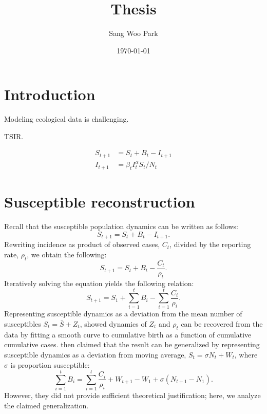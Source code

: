 \documentclass{article}
\title{Thesis}
\date{\today}
\author{Sang Woo Park}
\begin{document}
\maketitle

\section{Introduction}

Modeling ecological data is challenging.

TSIR.

\begin{equation}
\begin{aligned}
S_{t+1} &= S_t + B_t - I_{t+1}\\
I_{t+1} &= \beta_t I_{t}^\alpha S_t/N_t
\end{aligned}
\end{equation}

\section{Susceptible reconstruction}

Recall that the susceptible population dynamics can be written as follows:
\begin{equation}
S_{t+1} = S_{t} + B_t - I_{t+1}.
\end{equation}
Rewriting incidence as product of observed cases, $C_t$, divided by the reporting rate, $\rho_t$, we obtain the following:
\begin{equation}
S_{t+1} = S_t + B_t - \frac{C_t}{\rho_t}.
\end{equation}
Iteratively solving the equation yields the following relation:
\begin{equation}
S_{t+1} =  S_1 + \sum_{i=1}^t B_i - \sum_{i=1}^t \frac{C_i}{\rho_i}.
\label{eq:sus}
\end{equation}
Representing susceptible dynamics as a deviation from the mean number of susceptibles $S_t = \bar{S} + Z_t$, \cite{finkenstadt2000time} showed dynamics of $Z_t$ and $\rho_t$ can be recovered from the data by fitting a smooth curve to cumulative birth as a function of cumulative cumulative cases. 
\cite{dalziel2016persistent} then claimed that the result can be generalized by representing susceptible dynamics as a deviation from moving average, $S_t = \sigma N_t + W_t$, where $\sigma$ is proportion susceptible:
\begin{equation}
\sum_{i=1}^t B_i = \sum_{i=1}^t \frac{C_i}{\rho_i} + W_{t+1} - W_1 + \sigma (N_{t+1} - N_1).
\label{eq:gensus}
\end{equation}
However, they did not provide sufficient theoretical justification; here, we analyze the claimed generalization.
\end{document}
